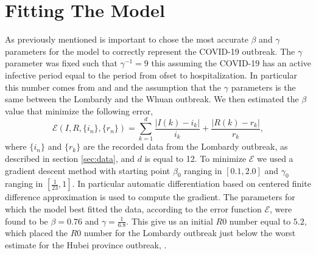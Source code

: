 \documentclass[]{article}
\begin{document}
\section{Fitting The Model} As previously mentioned is important to chose the most accurate $\beta$ and $\gamma$ parameters for the model to correctly represent the COVID-19 outbreak. The $\gamma$ parameter was fixed such that $\gamma^{-1}=9$ this assuming the COVID-19 has an active infective period equal to the period from ofset to hospitalization. In particular this number comes from \cite{backer2020} and \cite{li2020} and the assumption that the $\gamma$ parameters is the same between the Lombardy and the Whuan outbreak. We then estimated the $\beta$ value that minimize the following error,
\begin{equation}
	\mathcal{E}(I,R,\{i_n\},\{r_n\})=\sum_{k=1}^{d}\frac{|I(k)-i_k|}{i_k}+\frac{|R(k)-r_k|}{r_k},
\end{equation}
where $\{i_n\}$ and $\{r_k\}$ are the recorded data from the Lombardy outbreak, as described in section \ref{sec:data}, and $d$ is equal to 12.
To minimize $\mathcal{E}$ we used a gradient descent method with starting point $\beta_0$ ranging in $[0.1,2.0]$ and $\gamma_0$ ranging in $[\frac{1}{23},1]$. In particular automatic differentiation based on centered finite difference approximation is used to compute the gradient. The parameters for which the model best fitted the data, according to the error function $\mathcal{E}$, were found to be $\beta = 0.76$ and $\gamma=\frac{1}{6.8}$.
This give us an initial $R0$ number equal to $5.2$, which placed the $R0$ number for the Lombardy outbreak just below the worst estimate for the Hubei province outbreak, \cite{liu2020}.
\end{document}
